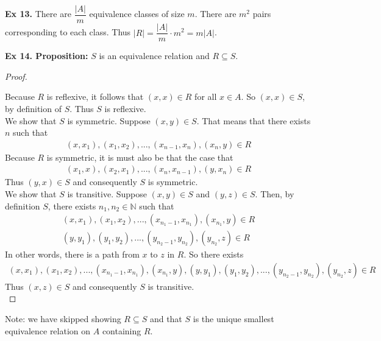 \documentclass{article}
\begin{document}
\noindent \textbf{Ex 13.} There are $\dfrac{|A|}{m}$ equivalence classes of size $m$. There are $m^2$ pairs corresponding to each class. Thus $|R|=\dfrac{|A|}{m} \cdot{} m^2=m|A|$.\\

\newpage

\noindent \textbf{Ex 14. Proposition:} $S$ is an equivalence relation and $R \subseteq S$.

\begin{proof}
$ $\newline

\noindent Because $R$ is reflexive, it follows that $(x,x) \in R$ for all $x \in A$. So $(x,x) \in S$, by definition of $S$. Thus $S$ is reflexive.\\

\noindent We show that $S$ is symmetric. Suppose $(x, y) \in S$. That means that there exists $n$ such that
\begin{align*}
(x,x_1), (x_1, x_2), ..., (x_{n-1}, x_{n}), (x_{n}, y) \in R
\end{align*}
Because $R$ is symmetric, it is must also be that the case that
\begin{align*}
(x_1,x), (x_2, x_1), ..., (x_n, x_{n-1}), (y, x_{n}) \in R
\end{align*}
Thus $(y, x) \in S$ and consequently $S$ is symmetric.\\

\noindent We show that $S$ is transitive. Suppose $(x, y) \in S$ and $(y, z) \in S$. Then, by definition $S$, there exists $n_1, n_2 \in \mathbb{N}$ such that
\begin{align*}
(x,x_1), (x_1, x_2), ..., (x_{n_1-1}, x_{n_1}), (x_{n_1}, y) \in R\\
(y,y_1), (y_1, y_2), ..., (y_{n_2-1}, y_{n_2}), (y_{n_2}, z) \in R
\end{align*}
In other words, there is a path from $x$ to $z$ in $R$. So there exists
\begin{align*}
(x,x_1), (x_1, x_2), ..., (x_{n_1-1}, x_{n_1}), (x_{n_1}, y), (y,y_1), (y_1, y_2), ..., (y_{n_2-1}, y_{n_2}), (y_{n_2}, z) \in R
\end{align*}
Thus $(x, z) \in S$ and consequently $S$ is transitive.\\
\end{proof}

\noindent Note: we have skipped showing $R \subseteq S$ and that $S$ is the unique smallest equivalence relation on $A$ containing $R$.\\
\end{document}
